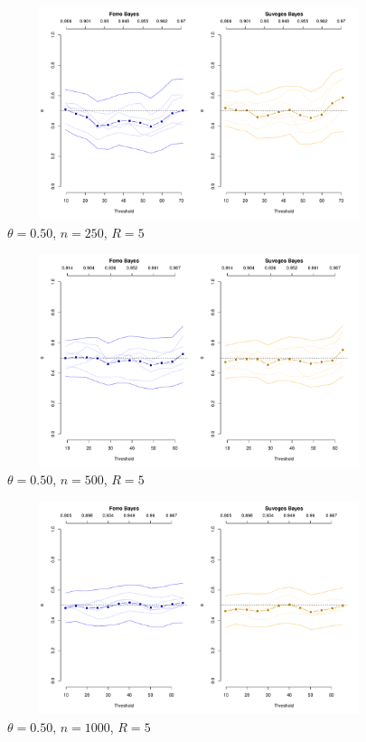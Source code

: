 \documentclass[12pt]{article}
\begin{document}
\newpage

\begin{figure}
\begin{center}
\includegraphics[width=5.5in, height=2.45in]{../extremal_comparison/figs/sim_frechet_hier_50_250_5.pdf}
\caption{$\theta=0.50$, $n=250$, $R=5$}
\end{center}
\end{figure}

\begin{figure}
\begin{center}
\includegraphics[width=5.5in, height=2.45in]{../extremal_comparison/figs/sim_frechet_hier_50_500_5.pdf}
\caption{$\theta=0.50$, $n=500$, $R=5$}
\end{center}
\end{figure}

\begin{figure}
\begin{center}
\includegraphics[width=5.5in, height=2.45in]{../extremal_comparison/figs/sim_frechet_hier_50_1000_5.pdf}
\caption{$\theta=0.50$, $n=1000$, $R=5$}
\end{center}
\end{figure}
\end{document}
